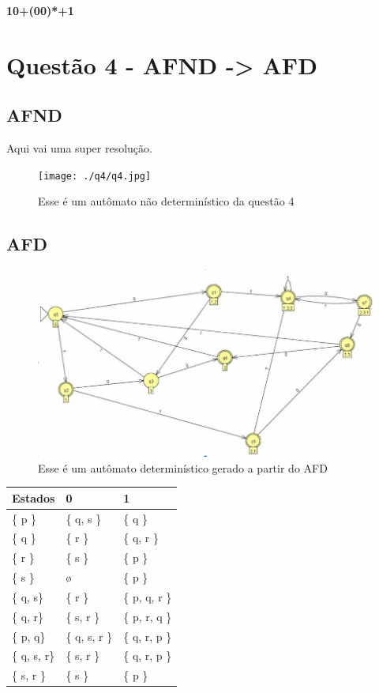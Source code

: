 \documentclass[11pt]{article}
\begin{document}
\textbf{10+(00)*+1} 
\pagebreak
\section{Questão 4 - AFND -> AFD}
\label{sec:org9c2c208}
\subsection{AFND}
\label{sec:orga81d0b9}
Aqui vai uma super resolução.
\begin{figure}[htbp]
\centering
\texttt{[image: ./q4/q4.jpg]}
\caption{\label{fig:org5d0b4fb}
Esse é um autômato não determinístico da questão 4}
\end{figure}

\subsection{AFD}
\label{sec:org8ca60cb}
\begin{figure}[htbp]
\centering
\includegraphics[width=.9\linewidth]{./q4/afd.jpg}
\caption{\label{fig:orgcf82d52}
Esse é um autômato determinístico gerado a partir do AFD}
\end{figure}

\begin{center}
\begin{tabular}{lll}
Estados & 0 & 1\\
\hline
\{ p \} & \{ q, s \} & \{ q \}\\
\{ q \} & \{ r \} & \{ q, r \}\\
\{ r \} & \{ s \} & \{ p \}\\
\{ s \} & ø & \{ p \}\\
\{ q, s\} & \{ r \} & \{ p, q, r \}\\
\{ q, r\} & \{ s, r \} & \{ p, r, q \}\\
\{ p, q\} & \{ q, s, r \} & \{ q, r, p \}\\
\{ q, s, r\} & \{ s, r \} & \{ q, r, p \}\\
\{ s, r \} & \{ s \} & \{ p \}\\
\end{tabular}
\end{center}
\end{document}

